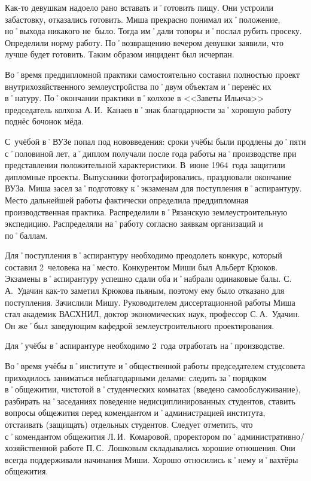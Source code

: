 Как-то девушкам надоело рано вставать и˚готовить пищу. Они устроили забастовку, отказались готовить. Миша прекрасно понимал их˚положение, но˚выхода никакого не~было. Тогда им˚дали топоры и˚послал рубить просеку. Определили норму работу. По˚возвращению вечером девушки заявили, что лучше будет готовить. Таким образом инцидент был исчерпан. 

Во˚время преддипломной практики самостоятельно составил полностью проект внутрихозяйственного землеустройства по˚двум объектам и˚перенёс их в˚натуру. По˚окончании практики в˚колхозе в <<Заветы Ильича>> председатель колхоза А.\,И.~Канаев в˚знак благодарности за˚хорошую работу поднёс бочонок мёда.

С~учёбой в˚ВУЗе попал под нововведения: сроки учёбы были продлены до˚пяти с˚половиной лет, а˚диплом получали после года работы на˚производстве при представлении положительной характеристики. В~июне 1964~года защитили дипломные проекты. Выпускники фотографировались, праздновали окончание ВУЗа. Миша засел за˚подготовку к˚экзаменам для поступления в˚аспирантуру. Место дальнейшей работы фактически определила преддипломная производственная практика. Распределили в˚Рязанскую землеустроительную экспедицию. Распределяли на˚работу согласно заявкам организаций и по˚баллам.

Для˚поступления в˚аспирантуру необходимо преодолеть конкурс, который составил 2~человека на˚место. Конкурентом Миши был Альберт Крюков. Экзамены в˚аспирантуру успешно сдали оба и˚набрали одинаковые балы. С.\,А.~Удачин как-то заметил Крюкова пьяным, поэтому ему было отказано для поступления. Зачислили Мишу. Руководителем диссертационной работы Миша стал академик ВАСХНИЛ, доктор экономических наук, профессор С.\,А.~Удачин. Он же˚был заведующим кафедрой землеустроительного проектирования.

Для˚учёбы в˚аспирантуре необходимо 2~года отработать на˚производстве.

Во˚время учёбы в˚институте и˚общественной работы председателем студсовета приходилось заниматься неблагодарными делами: следить за˚порядком в˚общежитии, чистотой в˚студенческих комнатах (введено самообслуживание), разбирать на˚заседаниях поведение недисциплинированных студентов, ставить вопросы общежития перед комендантом и˚администрацией института, отстаивать (защищать) отдельных студентов. Следует отметить, что с˚комендантом общежития Л.\,И.~Комаровой, проректором по˚административно\-/хозяйственной работе П.\,С.~Лошковым складывались хорошие отношения. Они всегда поддерживали начинания Миши. Хорошо относились к˚нему и˚вахтёры общежития.

